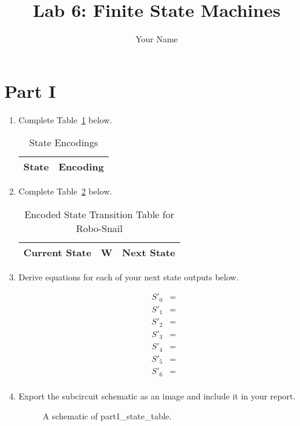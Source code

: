\documentclass{article}
\title{Lab 6: Finite State Machines}
\author{Your Name}
\begin{document}
\maketitle

\section{Part I}

\begin{enumerate}

\item Complete Table~\ref{t:part1_state_encodings} below.

\begin{table}[ht!]
\caption{State Encodings}
\label{t:part1_state_encodings}
\centering
\begin{tabular}{|l|l|}
\hline
State & Encoding \\ \hline
\end{tabular}
\end{table}

\item Complete Table~\ref{t:part1_encoded_transition_table} below.

\begin{table}[ht!]
\caption{Encoded State Transition Table for Robo-Snail}
\label{t:part1_encoded_transition_table}
\centering
\begin{tabular}{|l|l|l|}
\hline
Current State & W & Next State \\ \hline
\end{tabular}
\end{table}

\item Derive equations for each of your next state outputs below.

\begin{align*}
    S'_0 &= \\
    S'_1 &= \\
    S'_2 &= \\
    S'_3 &= \\
    S'_4 &= \\
    S'_5 &= \\
    S'_6 &= \\
\end{align*}

\item Export the subcircuit schematic as an image and include it in your report.

\begin{figure}[ht!]
    \centering
    \caption{A schematic of part1\_state\_table.}
    \label{f:part1_state_table}
\end{figure}


\end{enumerate}
\end{document}
